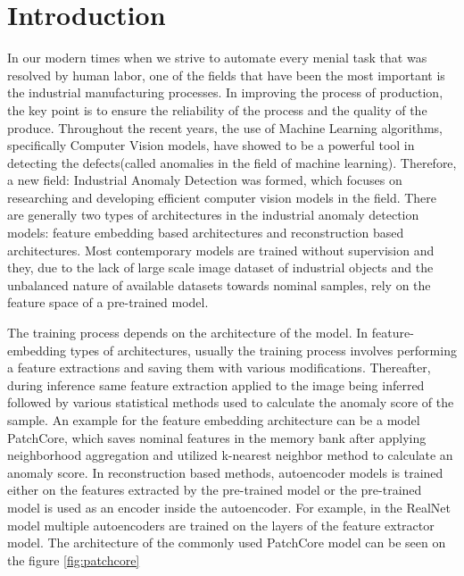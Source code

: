 \chapter{Introduction}
\label{chapter:intro}

In our modern times when we strive to automate every menial task that was resolved by human labor, one of the fields that have been the most important is the industrial manufacturing processes. In improving the process of production, the key point is to ensure the reliability of the process and the quality of the produce. Throughout the recent years, the use of Machine Learning algorithms, specifically Computer Vision models, have showed to be a powerful tool in detecting the defects(called anomalies in the field of machine learning)\cite{iad_survey}. Therefore, a new field: Industrial Anomaly Detection\cite{iad_survey} was formed, which focuses on researching and developing efficient computer vision models in the field. There are generally two types of architectures in the industrial anomaly detection models: feature embedding based architectures\cite{patchcore} and reconstruction based architectures\cite{realnet}. Most contemporary models are trained without supervision\cite{uiad_survey} and they, due to the lack of large scale image dataset of industrial objects\cite{mvtecad} and the unbalanced nature of available datasets towards nominal samples, rely on the feature space of a pre-trained model\cite{bergman2020deepnearestneighboranomaly}\cite{pre_trained}\cite{pre_trained_iad}.

The training process depends on the architecture of the model. In feature-embedding\cite{patchcore} types of architectures, usually the training process involves performing a feature extractions\cite{pre_trained} and saving them with various modifications\cite{pre_trained_iad}. Thereafter, during inference same feature extraction applied to the image being inferred followed by various statistical methods used to calculate the anomaly score of the sample\cite{patchcore}. An example for the feature embedding architecture can be a model PatchCore\cite{patchcore}, which saves nominal features in the memory bank after applying neighborhood aggregation and utilized k-nearest neighbor method\cite{knn} to calculate an anomaly score\cite{auroc}. In reconstruction based methods\cite{realnet}, autoencoder models\cite{autoencoder} is trained either on the features extracted by the pre-trained model or the pre-trained model is used as an encoder inside the autoencoder. For example, in the RealNet\cite{realnet} model multiple autoencoders are trained on the layers of the feature extractor model. The architecture of the commonly used PatchCore model can be seen on the figure \ref{fig:patchcore}

